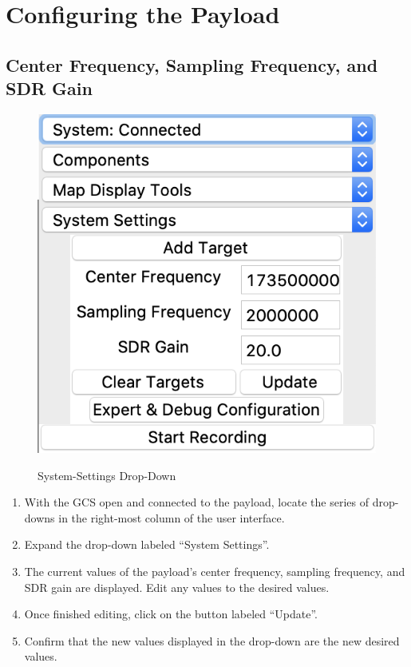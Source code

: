 \documentclass{report}
\begin{document}
	\section{Configuring the Payload}
		\subsection{Center Frequency, Sampling Frequency, and SDR Gain}
			\begin{figure}[htb]
				\centering
				\caption{System-Settings Drop-Down}
				\includegraphics[scale=0.5]{system_settings_dd.jpg}
				\label{fig:system_settings_dd}
			\end{figure}
			\begin{enumerate}
				\item With the GCS open and connected to the payload, locate the series of drop-downs in the right-most column of the user interface.
				\item Expand the drop-down labeled ``System Settings''.
				\item The current values of the payload's center frequency, sampling frequency, and SDR gain are displayed. Edit any values to the desired values.
				\item Once finished editing, click on the button labeled ``Update''. 
				\item Confirm that the new values displayed in the drop-down are the new desired values.
			\end{enumerate}
\end{document}
